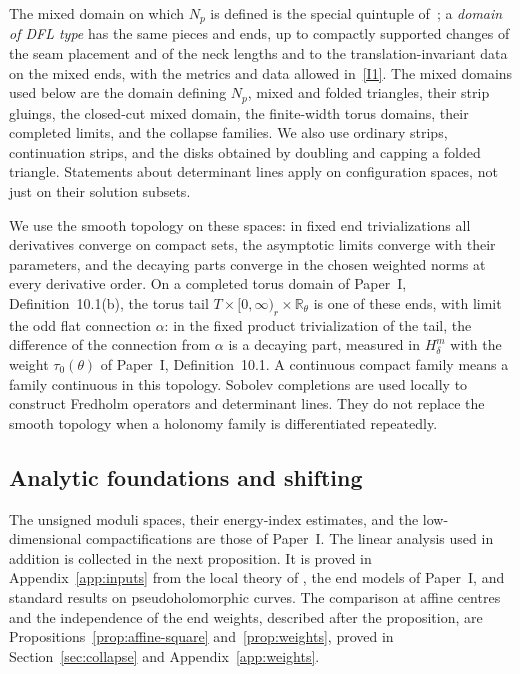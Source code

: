 \documentclass[11pt]{amsart}
\theoremstyle{definition}
\theoremstyle{remark}
\theoremstyle{plain}
\numberwithin{equation}{section}
\newcommand{\RR}{\mathbb R}
\begin{document}
The mixed domain on which $N_p$ is defined is the special quintuple of~\cite[Section~3.1]{DFL}; a
\emph{domain of DFL type} has the same pieces and ends, up to compactly supported changes of the seam placement and of the neck lengths and to the translation-invariant data on the mixed ends, with the metrics and data allowed in~\ref{I1}. The mixed domains used below are the domain defining $N_p$, mixed and folded
triangles, their strip gluings, the closed-cut mixed domain, the
finite-width torus domains, their completed limits, and the collapse
families. We also use ordinary strips, continuation strips, and the
disks obtained by doubling and capping a folded triangle. Statements
about determinant lines apply on configuration spaces, not just on
their solution subsets.

We use the smooth topology on these spaces: in fixed end
trivializations all derivatives converge on compact sets, the
asymptotic limits converge with their parameters, and the decaying
parts converge in the chosen weighted norms at every derivative
order. On a completed torus domain of Paper~I, Definition~10.1(b),
the torus tail $T\times[0,\infty)_r\times\RR_\theta$ is one of these
ends, with limit the odd flat connection $\alpha$: in the fixed product
trivialization of the tail, the difference of the connection from
$\alpha$ is a decaying part, measured in $H^m_\delta$ with the weight
$\tau_0(\theta)$ of Paper~I, Definition~10.1. A continuous compact
family means a family continuous in this topology. Sobolev completions are used locally to construct
Fredholm operators and determinant lines. They do not replace the
smooth topology when a holonomy family is differentiated repeatedly.

\subsection{Analytic foundations and shifting}\label{sec:analytic}
The unsigned moduli spaces, their energy-index estimates, and the
low-dimensional compactifications are those of Paper~I. The linear
analysis used in addition is collected in the next proposition. It is
proved in Appendix~\ref{app:inputs} from the local theory of
\cite{DFL,DFL-mixed}, the end models of Paper~I, and standard results
on pseudoholomorphic curves. The comparison at affine centres and the independence of the end weights, described after the proposition, are Propositions~\ref{prop:affine-square}
and~\ref{prop:weights}, proved in Section~\ref{sec:collapse}
and Appendix~\ref{app:weights}.
\end{document}
